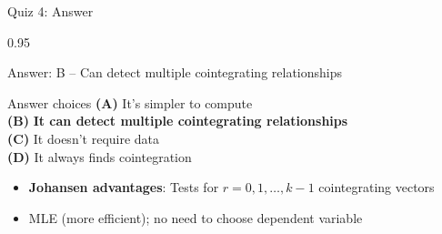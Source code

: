 \documentclass[9pt, aspectratio=169, t]{beamer}
\begin{document}
\begin{frame}{Quiz 4: Answer}
    \begin{cminipage}{0.95\textwidth}
    \begin{exampleblock}{Answer: B -- Can detect multiple cointegrating relationships}

    \begin{block}{Answer choices}
        \textcolor{MainBlue}{\textbf{(A)}} It's simpler to compute \incorrect\\[3pt]
        \textcolor{MainBlue}{\textbf{(B)}} \textbf{\textcolor{Forest}{It can detect multiple cointegrating relationships}} \correct\\[3pt]
        \textcolor{MainBlue}{\textbf{(C)}} It doesn't require data \incorrect\\[3pt]
        \textcolor{MainBlue}{\textbf{(D)}} It always finds cointegration \incorrect
    \end{block}

        \vspace{0.3cm}

        \begin{itemize}\setlength{\itemsep}{0pt}
            \item \textbf{Johansen advantages}: Tests for $r = 0, 1, \ldots, k-1$ cointegrating vectors
            \item MLE (more efficient); no need to choose dependent variable
        \end{itemize}
    \end{exampleblock}

    \end{cminipage}
\end{frame}
\end{document}
